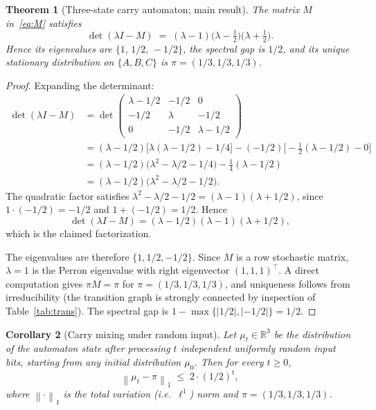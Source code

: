 \documentclass[11pt,a4paper]{article}
\newtheorem{theorem}{Theorem}[section]
\newtheorem{corollary}[theorem]{Corollary}
\theoremstyle{definition}
\theoremstyle{remark}
\newcommand{\R}{\mathbb{R}}
\newcommand{\norm}[1]{\left\|#1\right\|}
\begin{document}
\begin{theorem}[Three-state carry automaton; main result]\label{thm:automaton}
The matrix $M$ in~\eqref{eq:M} satisfies
\[
  \det(\lambda I - M) \;=\; (\lambda - 1)\bigl(\lambda - \tfrac{1}{2}\bigr)
  \bigl(\lambda + \tfrac{1}{2}\bigr).
\]
Hence its eigenvalues are $\{1,\, 1/2,\, -1/2\}$, the spectral gap is
$1/2$, and its unique stationary distribution on $\{A, B, C\}$ is
$\pi = (1/3, 1/3, 1/3)$.
\end{theorem}

\begin{proof}
Expanding the determinant:
\begin{align*}
  \det(\lambda I - M)
  &= \det\!\begin{pmatrix}
    \lambda - 1/2 & -1/2 & 0 \\
    -1/2 & \lambda & -1/2 \\
    0 & -1/2 & \lambda - 1/2
  \end{pmatrix} \\
  &= (\lambda - 1/2)\bigl[\lambda(\lambda - 1/2) - 1/4\bigr]
   - (-1/2)\bigl[-\tfrac{1}{2}(\lambda - 1/2) - 0\bigr] \\
  &= (\lambda - 1/2)\bigl(\lambda^2 - \lambda/2 - 1/4\bigr)
    - \tfrac{1}{4}(\lambda - 1/2) \\
  &= (\lambda - 1/2)\bigl(\lambda^2 - \lambda/2 - 1/2\bigr).
\end{align*}
The quadratic factor satisfies
$\lambda^2 - \lambda/2 - 1/2 = (\lambda - 1)(\lambda + 1/2)$, since
$1 \cdot (-1/2) = -1/2$ and $1 + (-1/2) = 1/2$.  Hence
\[
  \det(\lambda I - M) = (\lambda - 1/2)(\lambda - 1)(\lambda + 1/2),
\]
which is the claimed factorization.

The eigenvalues are therefore $\{1, 1/2, -1/2\}$.  Since $M$ is a row
stochastic matrix, $\lambda = 1$ is the Perron eigenvalue with right
eigenvector $(1, 1, 1)^\top$.  A direct computation gives
$\pi M = \pi$ for $\pi = (1/3, 1/3, 1/3)$, and uniqueness follows from
irreducibility (the transition graph is strongly connected by inspection
of Table~\ref{tab:trans}).  The spectral gap is
$1 - \max\{|1/2|, |-1/2|\} = 1/2$.
\end{proof}

\begin{corollary}[Carry mixing under random input]\label{cor:mixing}
Let $\mu_t \in \R^3$ be the distribution of the automaton state after
processing $t$ independent uniformly random input bits, starting from
any initial distribution $\mu_0$.  Then for every $t \geq 0$,
\[
  \norm{\mu_t - \pi}_1 \;\leq\; 2 \cdot (1/2)^t,
\]
where $\norm{\cdot}_1$ is the total variation (i.e.\ $\ell^1$) norm and
$\pi = (1/3, 1/3, 1/3)$.
\end{corollary}
\end{document}
